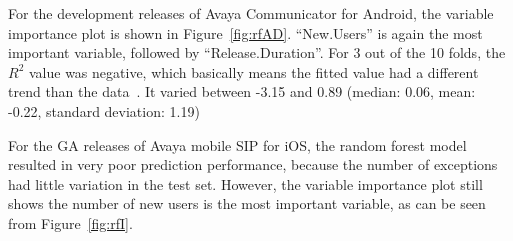 \documentclass[smallextended]{svjour3}       %
\begin{document}
For the development releases of Avaya Communicator for Android, the variable importance plot is shown in Figure~\ref{fig:rfAD}. ``New.Users'' is again the most important variable, followed by ``Release.Duration''. 
For 3 out of the 10 folds, the $R^2$ value was negative, which basically means the fitted value had a different trend than the data~\cite{negRsq}. It varied between -3.15 and 0.89 (median: 0.06, mean: -0.22, standard deviation: 1.19)

For the GA releases of Avaya mobile SIP for iOS, the random forest model resulted in very poor prediction performance, because the number of exceptions had little variation in the test set. However, the 
variable importance plot still shows the number of new users is the most important variable, as can be seen from Figure~\ref{fig:rfI}.
\end{document}
